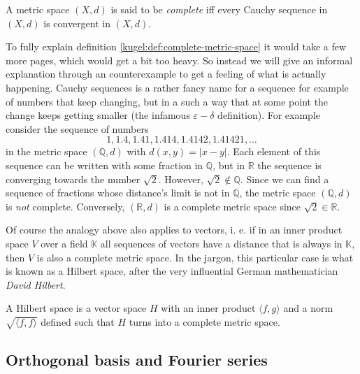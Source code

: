 \begin{definition}
  \label{kugel:def:complete-metric-space}
  A metric space \((X, d)\) is said to be \emph{complete} iff every Cauchy
  sequence in \((X, d)\) is convergent in \((X, d)\).
\end{definition}

To fully explain definition \ref{kugel:def:complete-metric-space} it would
take a few more pages, which would get a bit too heavy. So instead we will
give an informal explanation through an counterexample to get a feeling of
what is actually happening. Cauchy sequences is a rather fancy name for a
sequence for example of numbers that keep changing, but in a such a way that
at some point the change keeps getting smaller (the infamous
\(\varepsilon-\delta\) definition). For example consider the sequence of
numbers
\[
  1,
  1.4,
  1.41,
  1.414,
  1.4142,
  1.41421,
  \ldots
\]
in the metric space \((\mathbb{Q}, d)\) with \(d(x, y) = |x - y|\). Each
element of this sequence can be written with some fraction in \(\mathbb{Q}\),
but in \(\mathbb{R}\) the sequence is converging towards the number
\(\sqrt{2}\). However, \(\sqrt{2} \notin \mathbb{Q}\). Since we can find a
sequence of fractions whose distance's limit is not in \(\mathbb{Q}\), the
metric space \((\mathbb{Q}, d)\) is \emph{not} complete. Conversely,
\((\mathbb{R}, d)\) is a complete metric space since \(\sqrt{2} \in
\mathbb{R}\).

Of course the analogy above also applies to vectors, i. e. if in an inner
product space \(V\) over a field \(\mathbb{K}\) all sequences of vectors have
a distance that is always in \(\mathbb{K}\), then \(V\) is also a complete
metric space. In the jargon, this particular case is what is known as a
Hilbert space, after the very influential German mathematician \emph{David Hilbert}.

\begin{definition}
  \label{kugel:def:hilbert}
  A Hilbert space is a vector space \(H\) with an inner product \(\langle f, g
  \rangle\) and a norm \(\sqrt{\langle f, f \rangle}\) defined such that \(H\)
  turns into a complete metric space.
\end{definition}

\subsection{Orthogonal basis and Fourier series}
\label{kugel:sec:preliminaries:ortho-fourier}

